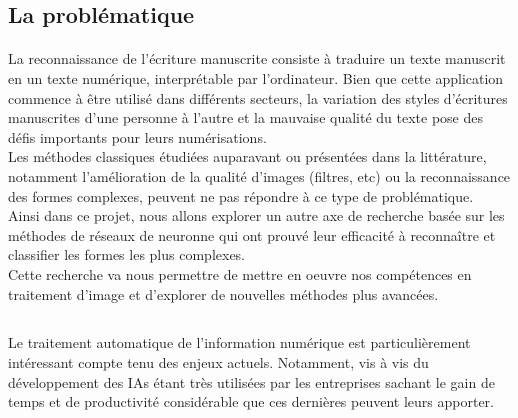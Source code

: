 \documentclass[a4paper]{article}
\begin{document}
		\subsection{La problématique}
			\paragraph{}
				La reconnaissance de l'écriture manuscrite consiste à traduire un texte manuscrit en un texte numérique, interprétable par l'ordinateur. Bien que cette application commence à être utilisé dans différents secteurs, 
				la variation des styles d'écritures manuscrites d'une personne à l'autre et la mauvaise qualité du texte pose des défis importants pour leurs numérisations.%
\\Les méthodes classiques étudiées auparavant ou présentées dans la littérature, notamment l'amélioration de la qualité d'images (filtres, etc) ou la reconnaissance des formes complexes, peuvent ne pas répondre à ce type de problématique.
\\Ainsi dans ce projet, nous allons explorer un autre axe de recherche basée sur les méthodes de réseaux de neuronne qui ont prouvé leur efficacité à reconnaître et classifier les formes les plus complexes.
\\Cette recherche va nous permettre de mettre en oeuvre nos compétences en traitement d'image et d'explorer de nouvelles méthodes plus avancées.

		\subsection*{}
			Le traitement automatique de l'information numérique est particulièrement intéressant compte tenu des enjeux actuels. Notamment, vis à vis du développement des IAs étant très utilisées par les entreprises 
			sachant le gain de temps et de productivité considérable que ces dernières peuvent leurs apporter.
\end{document}
